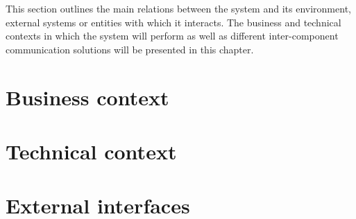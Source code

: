 This section outlines the main relations between the system and its environment, external systems or entities with which it interacts. The business and technical contexts in which the system will perform as well as different inter-component communication solutions will be presented in this chapter.

\section{Business context}
\label{sec:business_context}


\section{Technical context}
\label{sec:technical_context}


\section{External interfaces}
\label{sec:ext_interfaces}

